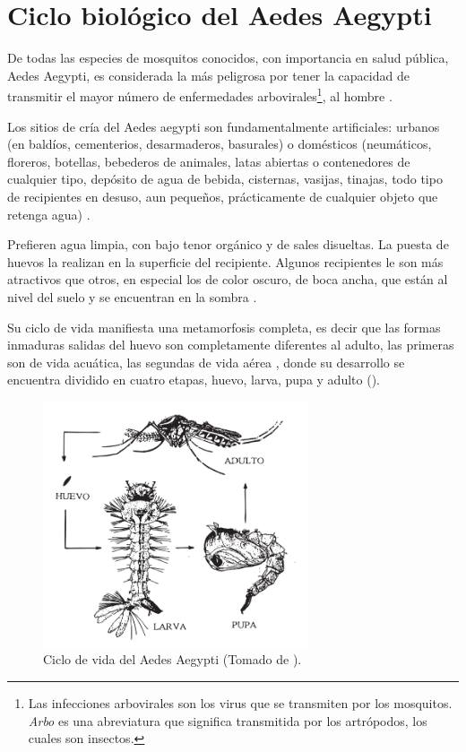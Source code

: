 
\section{Ciclo biológico del Aedes Aegypti}
\label{sec:caracteristicas-biologicas}
De todas las especies de mosquitos conocidos, con importancia en salud pública, Aedes Aegypti,
es considerada la más peligrosa por tener la capacidad de transmitir el mayor número de
enfermedades arbovirales\footnote{Las infecciones arbovirales son los virus que se transmiten por
los mosquitos. \textit{Arbo} es una abreviatura que significa transmitida por los artrópodos, los
cuales son insectos.}, al hombre \cite{ThironIzcazaJ2003}.

Los sitios de cría del Aedes aegypti son fundamentalmente artificiales: urbanos (en baldíos,
cementerios, desarmaderos, basurales) o domésticos (neumáticos, floreros, botellas, bebederos de
animales, latas abiertas o contenedores de cualquier tipo, depósito de agua de bebida, cisternas,
vasijas, tinajas, todo tipo de recipientes en desuso, aun pequeños, prácticamente de cualquier
objeto que retenga agua) \cite{directricesDetvArg}.

Prefieren agua limpia, con bajo tenor orgánico y de sales disueltas. La puesta de huevos la
realizan en la superficie del recipiente. Algunos recipientes le son más atractivos que otros, en
especial los de color oscuro, de boca ancha, que están al nivel del suelo y se encuentran en la
sombra \cite{ThironIzcazaJ2003}.


Su ciclo de vida manifiesta una metamorfosis completa, es decir que las formas inmaduras salidas
del huevo son completamente diferentes al adulto, las primeras son de vida acuática, las segundas
de vida aérea \cite{directricesDetvArg}, donde su desarrollo se encuentra dividido en cuatro
etapas, huevo, larva, pupa y adulto \cite{web-site:gMonteroBiologia}
().

\begin{figure}[H]
\centering
\includegraphics[width=0.7\textwidth]{capitulo-3/graphics/ciclo-de-vida.png}
\caption{\label{fig:cap3-ciclo-de-vida} Ciclo de vida del Aedes Aegypti (Tomado de
\cite{directricesDetvArg}).}
\end{figure}

